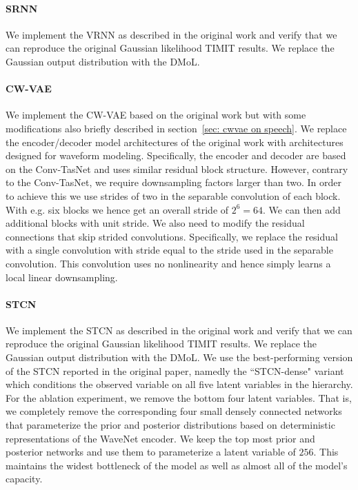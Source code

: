 {\paragraph{SRNN}
We implement the VRNN as described in the original work \cite{fraccaro_sequential_2016} and verify that we can reproduce the original Gaussian likelihood TIMIT results. We replace the Gaussian output distribution with the DMoL. 

\paragraph{CW-VAE} We implement the CW-VAE based on the original work \cite{saxena_clockwork_2021} but with some modifications also briefly described in section~\cref{sec: cwvae on speech}. We replace the encoder/decoder model architectures of the original work with architectures designed for waveform modeling. Specifically, the encoder and decoder are based on the Conv-TasNet \cite{luo_conv-tasnet_2019} and uses similar residual block structure. However, contrary to the Conv-TasNet, we require downsampling factors larger than two. In order to achieve this we use strides of two in the separable convolution of each block. With e.g. six blocks we hence get an overall stride of $2^6=64$. We can then add additional blocks with unit stride.
We also need to modify the residual connections that skip strided convolutions. Specifically, we replace the residual with a single convolution with stride equal to the stride used in the separable convolution. This convolution uses no nonlinearity and hence simply learns a local linear downsampling.

\paragraph{STCN} We implement the STCN as described in the original work \cite{aksan_stcn_2019} and verify that we can reproduce the original Gaussian likelihood TIMIT results. We replace the Gaussian output distribution with the DMoL. We use the best-performing version of the STCN reported in the original paper, namedly the ``STCN-dense" variant which conditions the observed variable on all five latent variables in the hierarchy. For the ablation experiment, we remove the bottom four latent variables. That is, we completely remove the corresponding four small densely connected networks that parameterize the prior and posterior distributions based on deterministic representations of the WaveNet encoder. We keep the top most prior and posterior networks and use them to parameterize a latent variable of $256$. This maintains the widest bottleneck of the model as well as almost all of the model's capacity.

}
